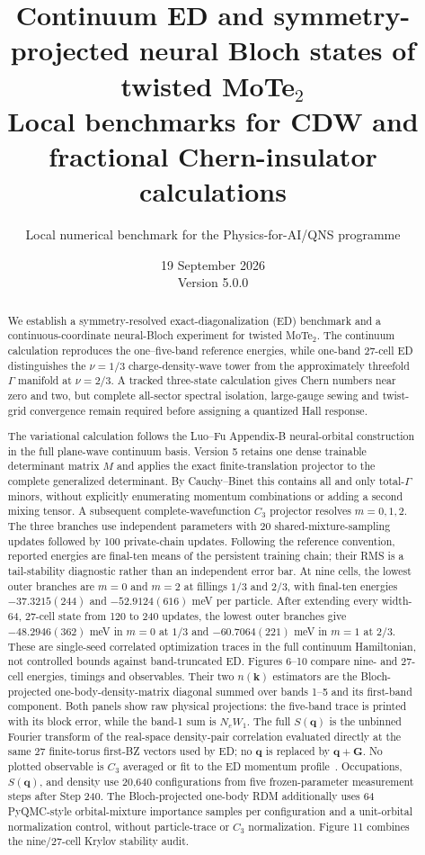 \documentclass[10pt,twocolumn]{article}
\title{Continuum ED and symmetry-projected neural Bloch states of twisted MoTe$_2$\\
\large Local benchmarks for CDW and fractional Chern-insulator calculations}
\author{Local numerical benchmark for the Physics-for-AI/QNS programme}
\date{19 September 2026\\Version 5.0.0}
\begin{document}
\maketitle

\begin{abstract}
We establish a symmetry-resolved exact-diagonalization (ED) benchmark and a
continuous-coordinate neural-Bloch experiment for twisted MoTe$_2$.  The
continuum calculation reproduces the one--five-band reference energies, while
one-band 27-cell ED distinguishes the $\nu=1/3$ charge-density-wave tower from
the approximately threefold $\Gamma$ manifold at $\nu=2/3$.  A tracked
three-state calculation gives Chern numbers near zero and two, but complete
all-sector spectral isolation, large-gauge sewing and twist-grid convergence
remain required before assigning a quantized Hall response.

The variational calculation follows the Luo--Fu Appendix-B neural-orbital
construction in the full plane-wave continuum basis. Version 5 retains one
dense trainable determinant matrix $M$ and applies the exact finite-translation
projector to the complete generalized determinant. By Cauchy--Binet this
contains all and only total-$\Gamma$ minors, without explicitly enumerating
momentum combinations or adding a second mixing tensor. A subsequent
complete-wavefunction $C_3$ projector resolves $m=0,1,2$. The three branches
use independent parameters with 20 shared-mixture-sampling updates followed
by 100 private-chain updates. Following the reference convention, reported
energies are final-ten means of the persistent training chain; their RMS is a
tail-stability diagnostic rather than an independent error bar. At nine cells,
the lowest outer branches are $m=0$ and $m=2$ at fillings $1/3$ and $2/3$,
with final-ten energies $-37.3215(244)$ and $-52.9124(616)$ meV per particle.
After extending every width-64, 27-cell state from 120 to 240 updates, the
lowest outer branches give $-48.2946(362)$ meV in $m=0$ at $1/3$ and
$-60.7064(221)$ meV in $m=1$ at $2/3$. These are single-seed
correlated optimization traces in the full continuum Hamiltonian, not
controlled bounds against band-truncated ED. Figures 6--10 compare nine- and
27-cell energies, timings and observables. Their two $n(\bm k)$ estimators are
the Bloch-projected one-body-density-matrix diagonal summed over bands 1--5
and its first-band component. Both panels show raw physical projections:
the five-band trace is printed with its block error, while the band-1 sum is
$N_eW_1$. The full $S(\bm q)$ is the unbinned Fourier transform of the
real-space density-pair correlation evaluated directly at the same 27
finite-torus first-BZ vectors used by ED; no $\bm q$ is replaced by
$\bm q+\bm G$.
No plotted observable is $C_3$ averaged or fit to the ED
momentum profile~\cite{luo,limomentum}. Occupations, $S(\bm q)$, and density
use 20,640 configurations from five frozen-parameter measurement steps after
Step 240. The Bloch-projected one-body RDM additionally uses 64 PyQMC-style
orbital-mixture importance samples per configuration and a unit-orbital
normalization control, without particle-trace or $C_3$ normalization. Figure 11 combines the
nine/27-cell Krylov stability audit.
\end{abstract}
\end{document}
